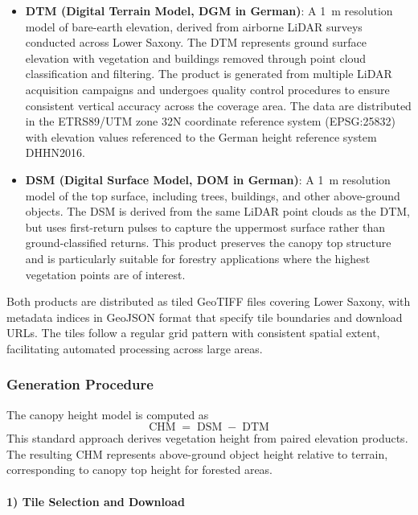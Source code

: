 \begin{itemize}
    \item \textbf{DTM (Digital Terrain Model, DGM in German)}: A \SI{1}{\meter} resolution model of bare-earth elevation, derived from airborne LiDAR surveys conducted across Lower Saxony. The DTM represents ground surface elevation with vegetation and buildings removed through point cloud classification and filtering. The product is generated from multiple LiDAR acquisition campaigns and undergoes quality control procedures to ensure consistent vertical accuracy across the coverage area. The data are distributed in the ETRS89/UTM zone 32N coordinate reference system (EPSG:25832) with elevation values referenced to the German height reference system DHHN2016.
    \item \textbf{DSM (Digital Surface Model, DOM in German)}: A \SI{1}{\meter} resolution model of the top surface, including trees, buildings, and other above-ground objects. The DSM is derived from the same LiDAR point clouds as the DTM, but uses first-return pulses to capture the uppermost surface rather than ground-classified returns. This product preserves the canopy top structure and is particularly suitable for forestry applications where the highest vegetation points are of interest.
\end{itemize}

Both products are distributed as tiled GeoTIFF files covering Lower Saxony, with metadata indices in GeoJSON format that specify tile boundaries and download URLs. The tiles follow a regular grid pattern with consistent spatial extent, facilitating automated processing across large areas.

\subsubsection{Generation Procedure}

The canopy height model is computed as
\begin{equation}
    \operatorname{CHM} = \operatorname{DSM} - \operatorname{DTM} 
\end{equation}
This standard approach derives vegetation height from paired elevation products. The resulting CHM represents above-ground object height relative to terrain, corresponding to canopy top height for forested areas.

\paragraph{1) Tile Selection and Download}

